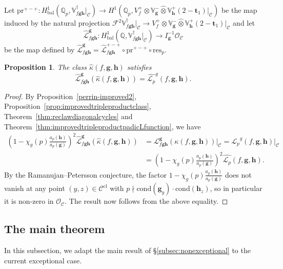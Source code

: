 \documentclass[a4paper,11pt]{amsart}
\theoremstyle{plain}
\newtheorem{propo}[theorem]{Proposition}
\theoremstyle{definition}
\theoremstyle{remark}
\newcommand{\bb}{\mathbb}
\newcommand{\cl}{\mathcal}
\DeclareMathOperator{\bal}{bal}
\newcommand{\Lp}{{\mathscr{L}_p}}
\newcommand{\hg}{{\mathbf{g}}}
\newcommand{\hh}{{\mathbf h}}
\newcommand{\res}{\mathrm{res}}
\numberwithin{equation}{section}
\begin{document}
Let $\mathrm{pr}^{+-+}:H^1_{\bal}(\bb{Q}_p,\bb{V}_{f\hg\hh}^\dagger\vert_{\cl{C}})\rightarrow H^1(\bb{Q}_p,V_f^+\otimes\bb{V}_{\hg}^-\hat{\otimes}\bb{V}_\hh^+(2-\mathbf{t}_1)\vert_{\cl{C}})$ be the map induced by the natural projection $\mathscr{F}^2\bb{V}_{f\hg\hh}^\dagger\vert_{\cl{C}}\rightarrow V_f^+\otimes\bb{V}_\hg^-\hat{\otimes}\bb{V}_\hh^+(2-\mathbf{t}_1)\vert_{\cl{C}}$ and let
\[
\widehat{\mathcal{L}}_{f\hg\hh}^{\hg}:H^1_{\bal}(\bb{Q},\bb{V}_{f\hg\hh}^\dagger\vert_{\cl{C}})\longrightarrow I_{\hg}^{-1}\cl{O}_{\cl{C}}
\]
be the map defined by $\widehat{\mathcal{L}}_{f\hg\hh}^\hg=\widehat{\mathcal{L}}_{f\hg\hh}^{+-+}\circ \mathrm{pr}^{+-+}\circ \res_p$.

\begin{propo}
    The class $\widehat{\kappa}(f,\hg,\hh)$ satisfies
    \[
    \widehat{\cl{L}}_{f\hg\hh}^{\hg}(\widehat{\kappa}(f,\hg,\hh))=\widehat{\Lp}^g(f,\hg,\hh).
    \]
\end{propo}
\begin{proof}
    By Proposition~\ref{perrin-improved2}, Proposition~\ref{prop:improvedtripleproductclass}, Theorem~\ref{thm:reclawdiagonalcycles} and Theorem~\ref{thm:improvedtripleproductpadicLfunction}, we have
    \begin{align*}
        \left( 1 - \chi_g(p)\frac{a_p(\hh)}{a_p(\hg)} \right)^2  \widehat{\cl{L}}_{f\hg\hh}^\hg (\widehat{\kappa}(f,\hg,\hh))&=\cl{L}_{f\hg\hh}^{\hg}(\kappa(f,\hg,\hh))\vert_{\cl{C}}= \Lp^g(f,\hg,\hh)\vert_{\cl{C}} \\
        &=\left(1-\chi_g(p)\frac{a_p(\hh)}{a_p(\hg)}\right)^2 \widehat{\Lp}(f,\hg,\hh).
    \end{align*}
    By the Ramanujan--Petersson conjecture, the factor $1-\chi_g(p)\frac{a_p(\hh)}{a_p(\hg)}$ does not vanish at any point $(y,z)\in\cl{C}^{\mathrm{cl}}$ with $p\nmid \mathrm{cond}(\hg_y)\cdot \mathrm{cond}(\hh_z)$, so in particular it is non-zero in $\cl{O}_{\cl{C}}$. The result now follows from the above equality.
\end{proof}



\subsection{The main theorem}

In this subsection, we adapt the main result of \S\ref{subsec:nonexceptional} to the current exceptional case.
\end{document}
